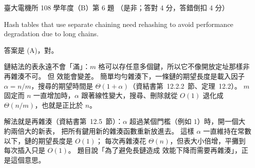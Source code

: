 \begin{pastexam}[label={px:ntu-108-ee-dsb-06}]{臺大電機所 108 學年度（B）第 6 題}
（是非；答對 4 分，答錯倒扣 4 分）

Hash tables that use separate chaining need rehashing to avoid performance degradation due to
long chains.
\end{pastexam}

\begin{pastsoln}
答案是 (A)，對。

鏈結法的表永遠不會「滿」：$m$ 格可以存任意多個鍵，所以它不像開放定址那樣非再雜湊不可。 但
效能會變差。 簡單均勻雜湊下，一條鏈的期望長度是載入因子 $\alpha = n/m$，搜尋的期望時間是
$\Theta(1 + \alpha)$（資結書第~12.2.2~節、定理~12.2）。 $m$ 固定而 $n$ 一直增加時，$\alpha$
跟著線性變大，搜尋、刪除就從 $O(1)$ 退化成 $\Theta(n/m)$，也就是正比於 $n$。

解法就是再雜湊（資結書第~12.5~節）：$\alpha$ 超過某個門檻（例如 $1$）時，開一個大約兩倍大的新表，
把所有鍵用新的雜湊函數重新放進去。 這樣 $\alpha$ 一直維持在常數以下，鏈的期望長度是 $O(1)$；
每次再雜湊花 $\Theta(n)$，但表大小倍增，平攤到每次插入只是 $O(1)$。 題目說「為了避免長鏈造成
效能下降而需要再雜湊」，正是這個意思。
\end{pastsoln}
